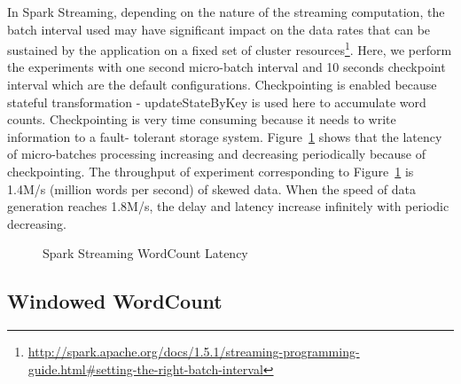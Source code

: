 In Spark Streaming, depending on the nature of the streaming computation, the batch interval used may have significant impact on the data rates that can be sustained by the application on a fixed set of cluster resources\footnote{\url{http://spark.apache.org/docs/1.5.1/streaming-programming-guide.html\#setting-the-right-batch-interval}}. Here, we perform the experiments with one second micro-batch interval and 10 seconds checkpoint interval which are the default configurations. Checkpointing is enabled because stateful transformation - updateStateByKey is used here to accumulate word counts.  Checkpointing is very time consuming because it needs to write information to a fault- tolerant storage system. Figure~\ref{fig:spark_wordcount_latency} shows that the latency of micro-batches processing increasing and decreasing periodically because of checkpointing. The throughput of experiment corresponding to Figure~\ref{fig:spark_wordcount_latency} is 1.4M/s (million words per second) of skewed data. When the speed of data generation reaches 1.8M/s, the delay and latency increase infinitely with periodic decreasing.

\begin{figure}
  \begin{center}
   \caption{Spark Streaming WordCount Latency}
   \label{fig:spark_wordcount_latency}
  \end{center}
\end{figure}


\subsection{Windowed WordCount}
\label{subsection:window_wordcount}

